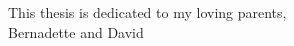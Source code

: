 
\begin{dedication} 

This thesis is dedicated to my loving parents,\\ Bernadette and David

\end{dedication}


